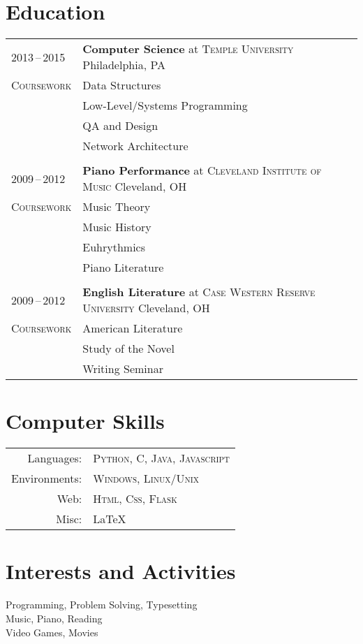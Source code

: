 \documentclass[a4paper,10pt]{article}
\begin{document}
\section{Education}
\begin{tabularx}{\textwidth}{@{}p{6em}|X@{}}
    2013\,--\,2015 & \textbf{Computer Science} at \textsc{Temple University} \hfill Philadelphia, PA \\
    \textsc{Coursework} & \footnotesize{Data Structures} \\
    & \footnotesize{Low-Level/Systems Programming} \\
    & \footnotesize{QA and Design} \\
    & \footnotesize{Network Architecture} \\
    \multicolumn{2}{c}{} \\
    2009\,--\,2012 & \textbf{Piano Performance} at \textsc{Cleveland Institute of Music} \hfill Cleveland, OH \\
    \textsc{Coursework} & \footnotesize{Music Theory} \\
    & \footnotesize{Music History} \\
    & \footnotesize{Euhrythmics} \\
    & \footnotesize{Piano Literature} \\
    \multicolumn{2}{c}{} \\
    2009\,--\,2012 & \textbf{English Literature} at \textsc{Case Western Reserve University} \hfill Cleveland, OH \\
    \textsc{Coursework} & \footnotesize{American Literature} \\
    & \footnotesize{Study of the Novel} \\
    & \footnotesize{Writing Seminar}
\end{tabularx}

\section{Computer Skills}
\begin{tabular}{@{}rl}
    Languages:& \textsc{Python}, \textsc{C}, \textsc{Java}, \textsc{Javascript} \\
    Environments:& \textsc{Windows}, \textsc{Linux/Unix} \\
    Web:& \textsc{Html}, \textsc{Css}, \textsc{Flask} \\
    Misc:& {\LaTeX}\
\end{tabular}

\section{Interests and Activities}
Programming, Problem Solving, Typesetting \\
Music, Piano, Reading \\
Video Games, Movies
\end{document}

